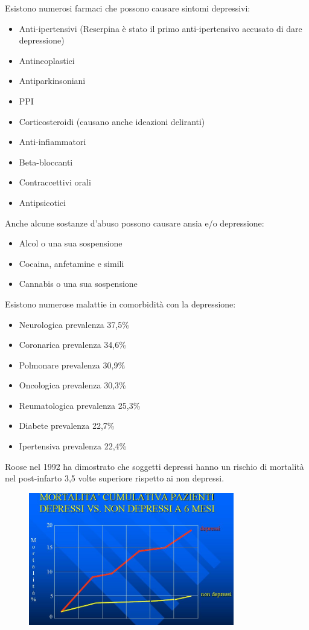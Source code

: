 Esistono numerosi farmaci che possono causare sintomi depressivi:

\begin{itemize}
\item
  Anti-ipertensivi (Reserpina è stato il primo anti-ipertensivo accusato
  di dare depressione)
\item
  Antineoplastici
\item
  Antiparkinsoniani
\item
  PPI
\item
  Corticosteroidi (causano anche ideazioni deliranti)
\item
  Anti-infiammatori
\item
  Beta-bloccanti
\item
  Contraccettivi orali
\item
  Antipsicotici
\end{itemize}

Anche alcune sostanze d'abuso possono causare ansia e/o depressione:

\begin{itemize}
\item
  Alcol o una sua sospensione
\item
  Cocaina, anfetamine e simili
\item
  Cannabis o una sua sospensione
\end{itemize}

Esistono numerose malattie in comorbidità con la depressione:

\begin{itemize}
\item
  Neurologica prevalenza 37,5\%
\item
  Coronarica prevalenza 34,6\%
\item
  Polmonare prevalenza 30,9\%
\item
  Oncologica prevalenza 30,3\%
\item
  Reumatologica prevalenza 25,3\%
\item
  Diabete prevalenza 22,7\%
\item
  Ipertensiva prevalenza 22,4\%
\end{itemize}

Roose nel 1992 ha dimostrato che soggetti depressi hanno un rischio di
mortalità nel post-infarto 3,5 volte superiore rispetto ai non depressi.

\begin{figure}[!ht]
\centering
	\includegraphics[width=0.8\textwidth]{42/image4.jpeg}
	\end{figure}
	
